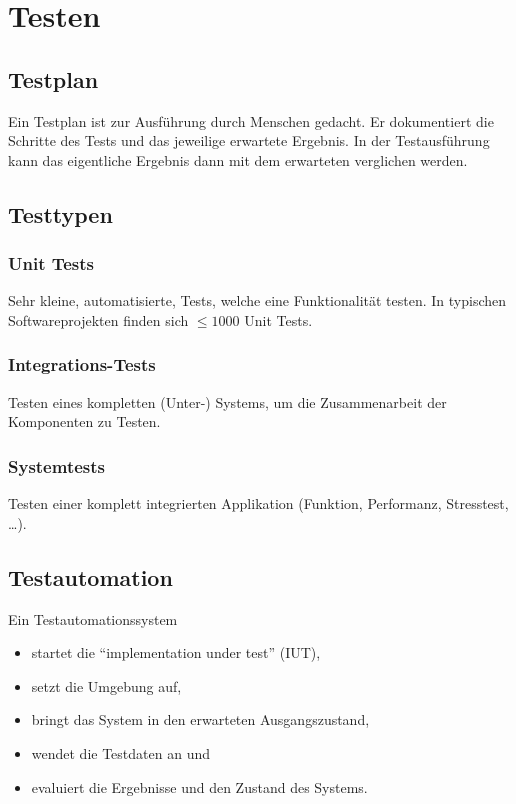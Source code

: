 	\section{Testen}
		\subsection{Testplan}
			Ein Testplan ist zur Ausführung durch Menschen gedacht. Er dokumentiert die Schritte des Tests und das jeweilige erwartete Ergebnis. In der Testausführung kann das eigentliche Ergebnis dann mit dem erwarteten verglichen werden.
	
		\subsection{Testtypen}
			\subsubsection{Unit Tests}
				Sehr kleine, automatisierte, Tests, welche eine Funktionalität testen. In typischen Softwareprojekten finden sich $ \leq 1000 $ Unit Tests.
			
			\subsubsection{Integrations-Tests}
				Testen eines kompletten (Unter-) Systems, um die Zusammenarbeit der Komponenten zu Testen.
			
			\subsubsection{Systemtests}
				Testen einer komplett integrierten Applikation (Funktion, Performanz, Stresstest, \dots).
		
		\subsection{Testautomation}
			Ein Testautomationssystem
			\begin{itemize}
				\item startet die \enquote{implementation under test} (IUT),
				\item setzt die Umgebung auf,
				\item bringt das System in den erwarteten Ausgangszustand,
				\item wendet die Testdaten an und
				\item evaluiert die Ergebnisse und den Zustand des Systems.
			\end{itemize}
		
